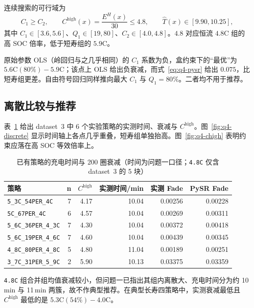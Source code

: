 连续搜索的可行域为
\begin{equation}
C_1\ge C_2,\qquad
C^{\mathrm{high}}(x)=\frac{E^{H}(x)}{30}\le 4.8,\qquad
\widehat T(x)\in[9.90,10.25],
\end{equation}
其中 \(C_1\in[3.6,5.6]\)、\(Q_1\in[19,80]\)、\(C_2\in[4.0,4.8]\)。\(4.8\) 对应恒流 \(4.8\mathrm{C}\) 组的高 SOC 倍率，低于短寿组的 \(5.9\mathrm{C}\)。

原始参数 OLS（岭回归与之几乎相同）的 \(C_1\) 系数为负，盒约束下的“最优”为 \(5.6\mathrm{C}(80\%)-5.9\mathrm{C}\)；该点上 OLS 给出负衰减，而式~\eqref{eq:q4-pysr} 给出 \(0.075\)，比短寿组更差。自由符号回归同样推向最大 \(C_1\) 与 \(Q_1=80\%\)。二者均不用于推荐。

\subsection{离散比较与推荐}

表~\ref{tab:q4-obs} 给出 dataset~3 中 6 个实验策略的实测时间、衰减与 \(C^{\mathrm{high}}\)。图~\ref{fig:q4-discrete} 显示时间轴上各点几乎重叠，短寿组单独抬高。图~\ref{fig:q4-chigh} 表明约束应落在高 SOC 等效倍率上。

\begin{table}[htbp]
\centering
\caption{已有策略的充电时间与 200 圈衰减（时间为问题一口径；\texttt{4.8C} 仅含 dataset~3 的 5 块）}
\label{tab:q4-obs}
\small
\begin{tabular}{lrrrrr}
\toprule
策略 & n & \(C^{\mathrm{high}}\) & 实测时间/min & 实测 Fade & PySR Fade \\
\midrule
\texttt{5\_3C\_54PER\_4C} & 7 & 4.17 & 10.04 & 0.00256 & 0.00228 \\
\texttt{5C\_67PER\_4C} & 6 & 4.57 & 10.04 & 0.00269 & 0.00311 \\
\texttt{5\_6C\_36PER\_4\_3C} & 7 & 4.30 & 10.04 & 0.00372 & 0.00418 \\
\texttt{5\_6C\_19PER\_4\_6C} & 7 & 4.60 & 10.04 & 0.00439 & 0.00345 \\
\texttt{4\_8C\_80PER\_4\_8C} & 5 & 4.80 & 11.04 & 0.00189 & 0.00251 \\
\texttt{3\_7C\_31PER\_5\_9C} & 2 & 5.90 & 10.13 & 0.03375 & 0.03359 \\
\bottomrule
\end{tabular}
\end{table}

\texttt{4.8C} 组合并组均值衰减较小，但问题一已指出其组内离散大、充电时间分为约 10\,min 与 11\,min 两簇，故不作典型推荐。在典型长寿四策略中，实测衰减最低且 \(C^{\mathrm{high}}\) 最低的是 \(5.3\mathrm{C}(54\%)-4.0\mathrm{C}\)。

